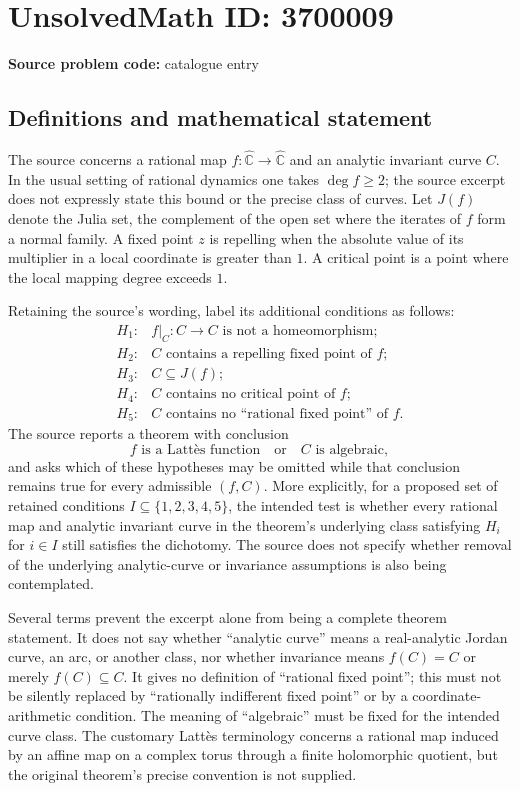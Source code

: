 \documentclass[11pt]{article}
\begin{document}
\section*{UnsolvedMath ID: 3700009}
\textbf{Source problem code:} catalogue entry
\subsection{Definitions and mathematical statement}
The source concerns a rational map \(f:\widehat{\mathbb C}\to\widehat{\mathbb C}\) and an analytic invariant curve \(C\). In the usual setting of rational dynamics one takes \(\deg f\ge2\); the source excerpt does not expressly state this bound or the precise class of curves. Let \(J(f)\) denote the Julia set, the complement of the open set where the iterates of \(f\) form a normal family. A fixed point \(z\) is repelling when the absolute value of its multiplier in a local coordinate is greater than \(1\). A critical point is a point where the local mapping degree exceeds \(1\).

Retaining the source's wording, label its additional conditions as follows:
\[
\begin{array}{ll}
H_1:& f|_C:C\to C\text{ is not a homeomorphism};\\
H_2:& C\text{ contains a repelling fixed point of }f;\\
H_3:& C\subseteq J(f);\\
H_4:& C\text{ contains no critical point of }f;\\
H_5:& C\text{ contains no ``rational fixed point'' of }f.
\end{array}
\]
The source reports a theorem with conclusion
\[
 f\text{ is a Latt\`es function}\quad\text{or}\quad C\text{ is algebraic},
\]
and asks which of these hypotheses may be omitted while that conclusion remains true for every admissible \((f,C)\). More explicitly, for a proposed set of retained conditions \(I\subseteq\{1,2,3,4,5\}\), the intended test is whether every rational map and analytic invariant curve in the theorem's underlying class satisfying \(H_i\) for \(i\in I\) still satisfies the dichotomy. The source does not specify whether removal of the underlying analytic-curve or invariance assumptions is also being contemplated.

Several terms prevent the excerpt alone from being a complete theorem statement. It does not say whether ``analytic curve'' means a real-analytic Jordan curve, an arc, or another class, nor whether invariance means \(f(C)=C\) or merely \(f(C)\subseteq C\). It gives no definition of ``rational fixed point''; this must not be silently replaced by ``rationally indifferent fixed point'' or by a coordinate-arithmetic condition. The meaning of ``algebraic'' must be fixed for the intended curve class. The customary Latt\`es terminology concerns a rational map induced by an affine map on a complex torus through a finite holomorphic quotient, but the original theorem's precise convention is not supplied.
\end{document}
